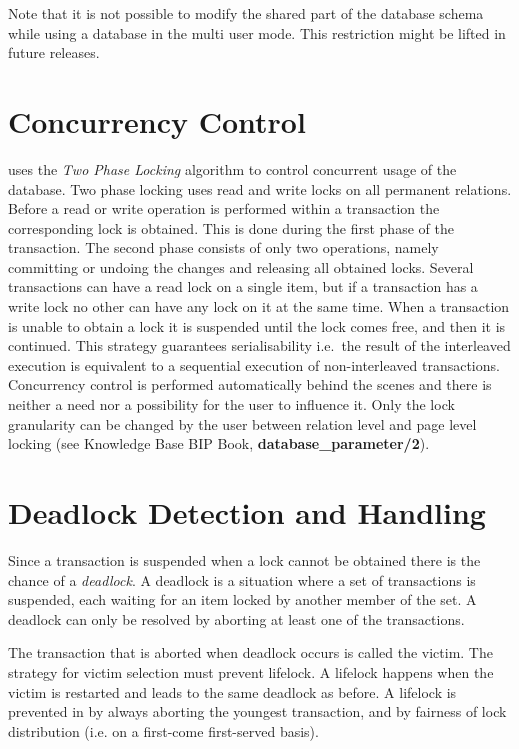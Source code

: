 Note that it is not possible to modify the shared part of the database
schema while using a database in the multi user mode. This restriction
might be lifted in future releases.

\section{Concurrency Control}
\eclipse uses the {\em Two Phase Locking} algorithm to control 
concurrent usage of the database.
Two phase locking uses read and write locks on  
all permanent relations. Before a read or write
operation is performed within a transaction the
corresponding lock is obtained.  This is done during
the first phase of the transaction.  The second phase consists
of only two operations, namely committing or undoing the  
changes and releasing all obtained locks.  Several transactions
can have a read lock on a single item, but if a transaction
has a write lock no other can have any lock on it at the
same time.  When a transaction is unable to
obtain a lock it is suspended until the lock comes free,
and then it is continued.
This strategy guarantees serialisability i.e.\
the result of the interleaved execution is equivalent
to a sequential execution of non-interleaved transactions.
Concurrency control is performed automatically behind
the scenes and there is neither a need nor a possibility for the user
to influence it. Only the lock granularity can be changed by the 
user between relation level and page level locking (see Knowledge Base BIP
Book, {\bf database_parameter/2}).

\section{Deadlock Detection and Handling}
Since a transaction is suspended when a lock cannot
be obtained there is the chance of a {\em deadlock}.
A deadlock is a situation where a set of transactions is
suspended, each waiting for an item locked by another member
of the set.  A deadlock can only be resolved by aborting at 
least one of the transactions. 

The transaction that is aborted when deadlock occurs is called 
the victim.  The strategy for victim selection must prevent 
lifelock. A lifelock happens when the victim is restarted and
leads to the same deadlock as before. A lifelock is prevented in 
\eclipse by always aborting the youngest transaction, and by
fairness of lock distribution (i.e. on a first-come first-served
basis).

